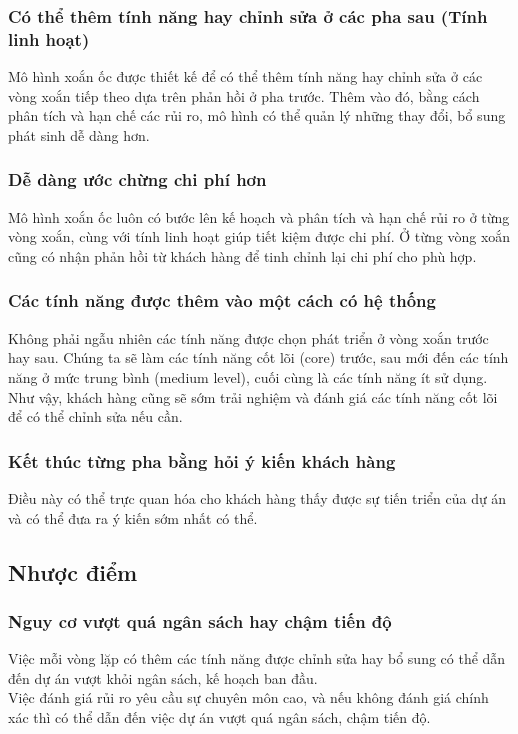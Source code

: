 \documentclass[14pt]{extarticle}
\begin{document}
\subsubsection*{Có thể thêm tính năng hay chỉnh sửa ở các pha sau (Tính linh hoạt)}
Mô hình xoắn ốc được thiết kế để có thể thêm tính năng hay chỉnh sửa ở
các vòng xoắn tiếp theo dựa trên phản hồi ở pha trước. Thêm vào đó,
bằng cách phân tích và hạn chế các rủi ro, mô hình có thể quản lý những
thay đổi, bổ sung phát sinh dễ dàng hơn.
\subsubsection*{Dễ dàng ước chừng chi phí hơn}
Mô hình xoắn ốc luôn có bước lên kế hoạch và phân tích và hạn chế rủi ro
ở từng vòng xoắn, cùng với tính linh hoạt giúp tiết kiệm được chi phí. Ở từng
vòng xoắn cũng có nhận phản hồi từ khách hàng để tinh chỉnh lại chi phí cho phù
hợp.
\subsubsection*{Các tính năng được thêm vào một cách có hệ thống}
Không phải ngẫu nhiên các tính năng được chọn phát triển ở vòng xoắn trước hay sau.
Chúng ta sẽ làm các tính năng cốt lõi (core) trước, sau mới đến các tính năng ở
mức trung bình (medium level), cuối cùng là các tính năng ít sử dụng.\\
Như vậy, khách hàng cũng sẽ sớm trải nghiệm và đánh giá các tính năng cốt lõi
để có thể chỉnh sửa nếu cần.
\subsubsection*{Kết thúc từng pha bằng hỏi ý kiến khách hàng}
Điều này có thể trực quan hóa cho khách hàng thấy được sự tiến triển của dự án
và có thể đưa ra ý kiến sớm nhất có thể.

\subsection{Nhược điểm}
\subsubsection*{Nguy cơ vượt quá ngân sách hay chậm tiến độ}
Việc mỗi vòng lặp có thêm các tính năng được chỉnh sửa hay bổ sung
có thể dẫn đến dự án vượt khỏi ngân sách, kế hoạch ban đầu.\\
Việc đánh giá rủi ro yêu cầu sự chuyên môn cao, và nếu không đánh giá
chính xác thì có thể dẫn đến việc dự án vượt quá ngân sách, chậm tiến độ.
\end{document}

